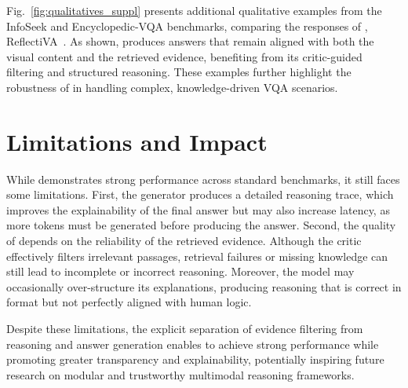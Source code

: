 Fig.~\ref{fig:qualitatives_suppl} presents additional qualitative examples from the InfoSeek and Encyclopedic-VQA benchmarks, comparing the responses of \ours, ReflectiVA~\cite{cocchi2025augmenting}. As shown, \ours produces answers that remain aligned with both the visual content and the retrieved evidence, benefiting from its critic-guided filtering and structured reasoning. These examples further highlight the robustness of \ours in handling complex, knowledge-driven VQA scenarios.

\section{Limitations and Impact} 
\label{supp:limitations}
While \ours demonstrates strong performance across standard benchmarks, it still faces some limitations. First, the generator produces a detailed reasoning trace, which improves the explainability of the final answer but may also increase latency, as more tokens must be generated before producing the answer. Second, the quality of \ours depends on the reliability of the retrieved evidence. Although the critic effectively filters irrelevant passages, retrieval failures or missing knowledge can still lead to incomplete or incorrect reasoning. Moreover, the model may occasionally over-structure its explanations, producing reasoning that is correct in format but not perfectly aligned with human logic. 

Despite these limitations, the explicit separation of evidence filtering from reasoning and answer generation enables \ours to achieve strong performance while promoting greater transparency and explainability, potentially inspiring future research on modular and trustworthy multimodal reasoning frameworks.